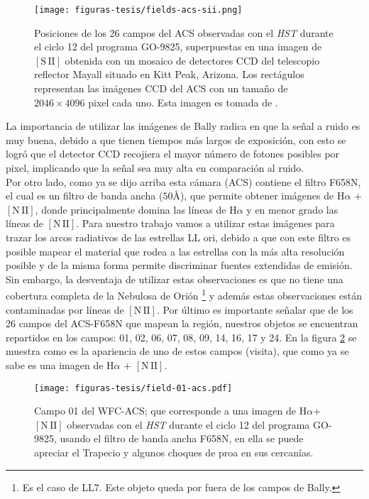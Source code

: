 \documentclass{article}
\newcommand\ha{\ensuremath{\mathrm{H}\alpha}}
\newcommand\nii{\ensuremath{\mathrm{[N\,II]}}}
\newcommand\sii{\ensuremath{\mathrm{[S\,II]}}}
\begin{document}
\begin{figure}
  \centering
  \texttt{[image: figuras-tesis/fields-acs-sii.png]}
  \caption{Posiciones de los 26 campos del ACS observadas con el \textit{HST} durante el ciclo 12 del programa GO-9825, superpuestas en una imagen de \(\sii\) obtenida con un mosaico de detectores CCD del telescopio reflector Mayall situado en Kitt Peak, Arizona. Los rectágulos representan las imágenes CCD del ACS con un tamaño de \(2046 \times 4096\) pixel cada uno. Esta imagen es tomada de \citet{Bally:2006a}.}
  \label{fig:fields}
\end{figure}

La importancia de utilizar las imágenes de Bally radica en que la señal a ruido es muy buena, debido a que tienen tiempos más largos de exposición, con esto se logró que el detector CCD recojiera el mayor número de fotones posibles por pixel, implicando que la señal sea muy alta en comparación al ruido.\\

Por otro lado, como ya se dijo arriba esta cámara (ACS) contiene el filtro F658N, el cual es un filtro de banda ancha (\(50 \text{Å}\)), que permite obtener imágenes de \ha{} + \nii{}, donde principalmente domina las líneas de \ha{} y en menor grado las líneas de \nii{}. Para nuestro trabajo vamos a utilizar estas imágenes para trazar los arcos radiativos de las estrellas LL ori, debido a que con este filtro es posible mapear el material que rodea a las estrellas con la más alta resolución posible y de la misma forma permite discriminar fuentes extendidas de emisión. Sin embargo, la desventaja de utilizar estas observaciones es que no tiene una cobertura completa de la Nebulosa de Orión \footnote{Es el caso de  LL7. Este objeto queda por fuera de los campos de Bally.} y además estas observaciones están contaminadas por líneas de \nii{}. Por último es importante señalar que de los 26 campos del ACS-F658N que mapean la región, nuestros objetos se encuentran repartidos en los campos: 01, 02, 06, 07, 08, 09, 14, 16, 17 y 24. En la figura \ref{fig:field-01} se muestra como es la apariencia de uno de estos campos (visita), que como ya se sabe es una imagen de \ha{} + \nii{}.\\

\begin{figure}
  \centering
  \texttt{[image: figuras-tesis/field-01-acs.pdf]}
  \caption{Campo 01 del WFC-ACS; que corresponde a una imagen de \ha{}+\nii{} observadas con el \textit{HST} durante el ciclo 12 del programa GO-9825, usando el filtro de banda ancha F658N, en ella se puede apreciar el Trapecio y algunos choques de proa en sus cercanías.}
  \label{fig:field-01}
\end{figure}
\end{document}
